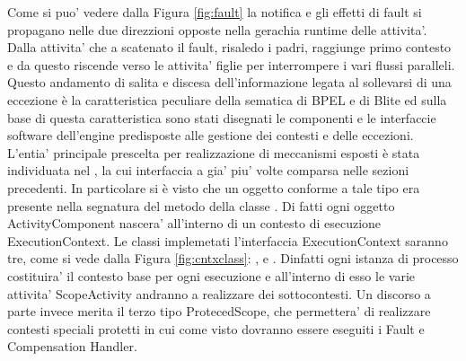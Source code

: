 Come si puo' vedere dalla Figura \ref{fig:fault} la notifica e gli effetti di
fault si propagano nelle due direzzioni opposte nella gerachia runtime delle
attivita'. Dalla attivita' che a scatenato il fault, risaledo i padri, raggiunge
primo contesto e da questo riscende verso le attivita' figlie per interrompere i
vari flussi paralleli. Questo andamento di salita e discesa dell'informazione
legata al sollevarsi di una eccezione \`e la caratteristica peculiare della
sematica di BPEL e di Blite ed sulla base di questa caratteristica sono stati
disegnati le componenti e le interfaccie software dell'engine predisposte alle
gestione dei contesti e delle eccezioni.
\\

L'entia' principale prescelta per realizzazione di meccanismi esposti \`e stata
individuata nel , la cui interfaccia a gia' piu' volte
comparsa nelle sezioni precedenti. In particolare si \`e visto che un oggetto
conforme a tale tipo era presente nella segnatura del metodo
 della classe
. Di fatti ogni oggetto ActivityComponent
nascera' all'interno di un contesto di esecuzione ExecutionContext.
Le classi implemetati l'interfaccia ExecutionContext saranno tre, come si vede
dalla Figura \ref{fig:cntxclass}: ,
 e . Dinfatti ogni istanza di processo
costituira' il contesto base per ogni esecuzione e all'interno di esso le varie
attivita' ScopeActivity andranno a realizzare dei sottocontesti. Un discorso a
parte invece merita il terzo tipo ProtecedScope, che permettera' di realizzare
contesti speciali protetti in cui come visto dovranno essere eseguiti i Fault e
Compensation Handler.

